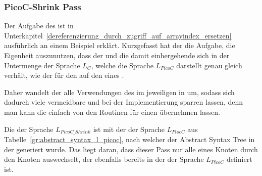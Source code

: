 \subsubsection{PicoC-Shrink Pass}
\label{picoc_shrink_pass}
\label{sec:picoc_shrink_pass_zweck}

Der Aufgabe des  ist in Unterkapitel~\ref{dereferenzierung_durch_zugriff_auf_arrayindex_ersetzen} ausführlich an einem Beispiel erklärt. Kurzgefasst hat der  die Aufgabe, die Eigenheit auszunutzen, dass der   und die damit einhergehende   sich in der Untermenge der Sprache $L_{C}$, welche die Sprache $L_{PicoC}$ darstellt genau gleich verhält, wie der  für den  auf den  eines  .

Daher wandelt der  alle Verwendungen des   im jeweiligen  in   um, sodass sich dadurch viele vermeidbare  und  bei der Implementierung sparren lassen, denn man kann die   einfach von den Routinen für einen   übernehmen lassen.


\begin{grammar}
  \toprule
  \commentsecond*
  \midrule
  \arith*
  \midrule
  \logic*
  \midrule
  \assign*
  \midrule
  \pntrshrink*
  \midrule
  \arraysecond*
  \midrule
  \struct*
  \midrule
  \ifelse*
  \midrule
  \loopsecond*
  \midrule
  \fun*
  \midrule
  \file*
  \bottomrule
\end{grammar}


Die  der Sprache $L_{PicoC\_Shrink}$ ist  mit der  der Sprache $L_{PiocC}$ aus Tabelle~\ref{gr:abstract_syntax_l_picoc}, nach welcher der  Abstract Syntax Tree in der  generiert wurde. Das liegt daran, dass dieser Pass nur alle  eines Knoten  durch den Knoten  auswechselt, der ebenfalls bereits in der  der Sprache $L_{PicoC}$ definiert ist.

